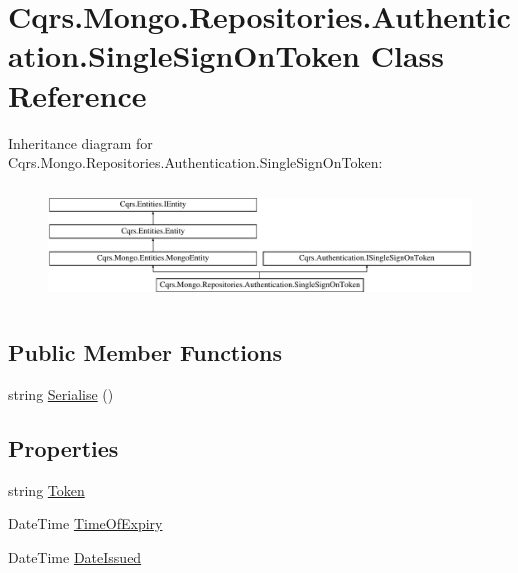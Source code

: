 \hypertarget{classCqrs_1_1Mongo_1_1Repositories_1_1Authentication_1_1SingleSignOnToken}{}\section{Cqrs.\+Mongo.\+Repositories.\+Authentication.\+Single\+Sign\+On\+Token Class Reference}
\label{classCqrs_1_1Mongo_1_1Repositories_1_1Authentication_1_1SingleSignOnToken}
Inheritance diagram for Cqrs.\+Mongo.\+Repositories.\+Authentication.\+Single\+Sign\+On\+Token\+:\begin{figure}[H]
\begin{center}
\leavevmode
\includegraphics[height=3.102493cm]{classCqrs_1_1Mongo_1_1Repositories_1_1Authentication_1_1SingleSignOnToken}
\end{center}
\end{figure}
\subsection*{Public Member Functions}
\begin{DoxyCompactItemize}
\item 
string \hyperlink{classCqrs_1_1Mongo_1_1Repositories_1_1Authentication_1_1SingleSignOnToken_ab0ad6b0a6065a2553a093214e5a033b5_ab0ad6b0a6065a2553a093214e5a033b5}{Serialise} ()
\end{DoxyCompactItemize}
\subsection*{Properties}
\begin{DoxyCompactItemize}
\item 
string \hyperlink{classCqrs_1_1Mongo_1_1Repositories_1_1Authentication_1_1SingleSignOnToken_a48105fdf07433e74837cdc922d0b2d1f_a48105fdf07433e74837cdc922d0b2d1f}{Token}
\item 
Date\+Time \hyperlink{classCqrs_1_1Mongo_1_1Repositories_1_1Authentication_1_1SingleSignOnToken_a8f4e70b3498d48ae914f02890750d096_a8f4e70b3498d48ae914f02890750d096}{Time\+Of\+Expiry}
\item 
Date\+Time \hyperlink{classCqrs_1_1Mongo_1_1Repositories_1_1Authentication_1_1SingleSignOnToken_a92a25011e2a4a44e5fb99c4ee9f75f4d_a92a25011e2a4a44e5fb99c4ee9f75f4d}{Date\+Issued}
\end{DoxyCompactItemize}


